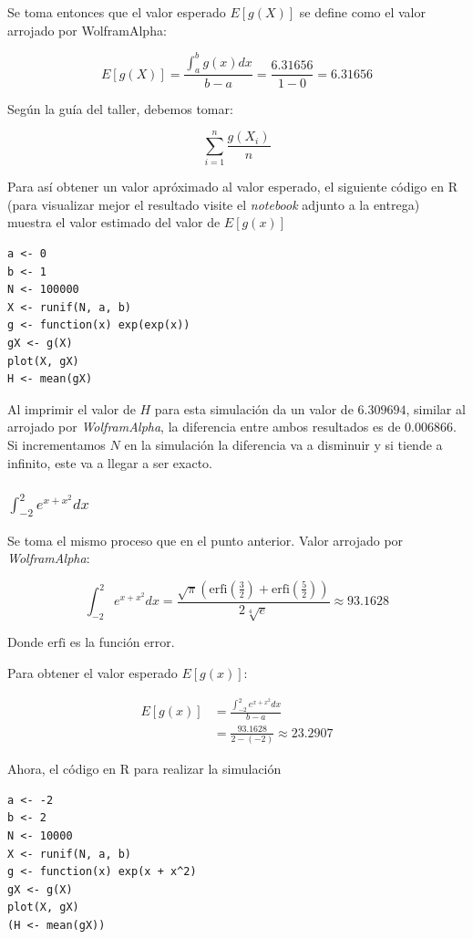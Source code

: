 \documentclass[12pt]{article}
\begin{document}
Se toma entonces que el valor esperado $E[g(X)]$ se define como el valor arrojado por WolframAlpha:

\[
E[g(X)] = \frac{\int_{a}^{b}g(x) dx}{b - a} = \frac{6.31656}{1 - 0} = 6.31656 
\]

Según la guía del taller, debemos tomar:

\[
\sum_{i = 1}^{n} \frac{g(X_{i})}{n}
\]

Para así obtener un valor apróximado al valor esperado, el siguiente código en \textsf{R} (para visualizar mejor el resultado visite el \textit{notebook} adjunto a la entrega) muestra el valor estimado del valor de $E[g(x)]$

\begin{lstlisting}
a <- 0
b <- 1
N <- 100000
X <- runif(N, a, b)
g <- function(x) exp(exp(x))
gX <- g(X)
plot(X, gX)
H <- mean(gX)
\end{lstlisting}

Al imprimir el valor de $H$ para esta simulación da un valor de $6.309694$, similar al arrojado por \textit{WolframAlpha}, la diferencia entre ambos resultados es de $0.006866$. Si incrementamos $N$ en la simulación la diferencia va a disminuir y si tiende a infinito, este va a llegar a ser exacto.


\subsubsection{$\int_{-2}^{2} e^{x + x^{2}} dx$}

Se toma el mismo proceso que en el punto anterior. Valor arrojado por \textit{WolframAlpha}:

\[
\int_{-2}^{2} e^{x + x^{2}} dx = \frac{\sqrt{\pi} \left(\mathrm{erfi} \left(\frac{3}{2} \right) + \mathrm{erfi} \left(\frac{5}{2} \right) \right)  }{2 \sqrt[4]{e}} \approx 93.1628
\]

Donde $\mathrm{erfi}$ es la función error.

Para obtener el valor esperado $E[g(x)]$:

\begin{align*}
  E[g(x)] &= \frac{\int_{-2}^{2} e^{x + x^{2}} dx}{b - a}  \\
  &= \frac{93.1628}{2 - (-2)} \approx 23.2907
\end{align*}

Ahora, el código en \textsf{R} para realizar la simulación

\begin{lstlisting}
a <- -2
b <- 2
N <- 10000
X <- runif(N, a, b)
g <- function(x) exp(x + x^2)
gX <- g(X)
plot(X, gX)
(H <- mean(gX))
\end{lstlisting}
\end{document}
